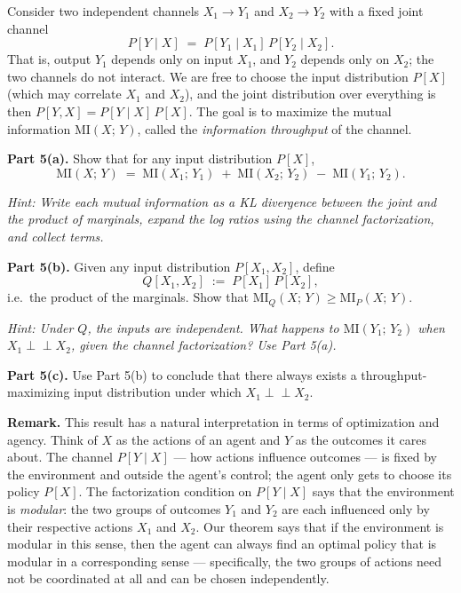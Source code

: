\documentclass[11pt]{article}
\begin{document}
\begin{exercise}
\label{ex:channel-additivity}
\noindent
Consider two independent channels $X_1 \to Y_1$ and $X_2 \to Y_2$ with a fixed
joint channel
\[
  P[Y \mid X] \;=\; P[Y_1 \mid X_1]\, P[Y_2 \mid X_2].
\]
That is, output $Y_1$ depends only on input $X_1$, and $Y_2$ depends only on $X_2$;
the two channels do not interact. We are free to choose the input distribution $P[X]$
(which may correlate $X_1$ and $X_2$), and the joint distribution over everything is
then $P[Y, X] = P[Y \mid X]\, P[X]$. The goal is to maximize the mutual information
$\mathrm{MI}(X;\, Y)$, called the \emph{information throughput} of the channel.

\medskip
\noindent
\textbf{Part 5(a).} Show that for any input distribution $P[X]$,
\[
  \mathrm{MI}(X;\, Y) \;=\;
  \mathrm{MI}(X_1;\, Y_1) \;+\; \mathrm{MI}(X_2;\, Y_2) \;-\;
  \mathrm{MI}(Y_1;\, Y_2).
\]

\medskip
\noindent
\emph{Hint: Write each mutual information as a KL divergence between the joint and
the product of marginals, expand the log ratios using the channel factorization, and
collect terms.}

\medskip
\noindent
\textbf{Part 5(b).} Given any input distribution $P[X_1, X_2]$, define
\[
  Q[X_1, X_2] \;:=\; P[X_1]\, P[X_2],
\]
i.e.\ the product of the marginals. Show that
$\mathrm{MI}_Q(X;\, Y) \geq \mathrm{MI}_P(X;\, Y)$.

\medskip
\noindent
\emph{Hint: Under $Q$, the inputs are independent. What happens to
$\mathrm{MI}(Y_1;\, Y_2)$ when $X_1 \perp\!\!\!\perp X_2$, given the channel
factorization? Use Part 5(a).}

\medskip
\noindent
\textbf{Part 5(c).} Use Part 5(b) to conclude that there always exists a
throughput-maximizing input distribution under which $X_1 \perp\!\!\!\perp X_2$.

\medskip
\noindent
\textbf{Remark.} This result has a natural interpretation in terms of optimization and agency. Think of $X$ as the actions of an agent and $Y$ as the outcomes it cares about. The channel $P[Y \mid X]$ — how actions influence outcomes — is fixed by the environment and outside the agent's control; the agent only gets to choose its policy $P[X]$. The factorization condition on $P[Y \mid X]$ says that the environment is \emph{modular}: the two groups of outcomes $Y_1$ and $Y_2$ are each influenced only by their respective actions $X_1$ and $X_2$. Our theorem says that if the environment is modular in this sense, then the agent can always find an optimal policy that is modular in a corresponding sense --- specifically, the two groups of actions need not be coordinated at all and can be chosen independently.
\end{exercise}
\end{document}
